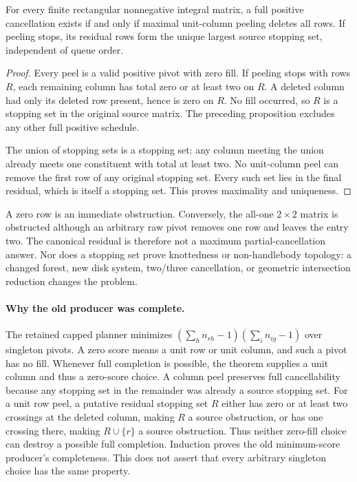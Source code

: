 \begin{proposition}
\label{marked-cut:rectangular-complete}
For every finite rectangular nonnegative integral matrix, a full positive
cancellation exists if and only if maximal unit-column peeling deletes all
rows. If peeling stops, its residual rows form the unique largest source
stopping set, independent of queue order.
\end{proposition}
\begin{proof}
Every peel is a valid positive pivot with zero fill. If peeling stops with
rows $R$, each remaining column has total zero or at least two on $R$.
A deleted column had only its deleted row present, hence is zero on $R$.
No fill occurred, so $R$ is a stopping set in the original source matrix.
The preceding proposition excludes any other full positive schedule.

The union of stopping sets is a stopping set: any column meeting the union
already meets one constituent with total at least two. No unit-column peel
can remove the first row of any original stopping set. Every such set lies
in the final residual, which is itself a stopping set. This proves maximality
and uniqueness.
\end{proof}

A zero row is an immediate obstruction. Conversely, the all-one $2\times2$
matrix is obstructed although an arbitrary raw pivot removes one row and
leaves the entry two. The canonical residual is therefore not a maximum
partial-cancellation answer. Nor does a stopping set prove knottedness or
non-handlebody topology: a changed forest, new disk system, two/three
cancellation, or geometric intersection reduction changes the problem.

\paragraph{Why the old producer was complete.}
The retained capped planner minimizes
$(\sum_hn_{rh}-1)(\sum_in_{ig}-1)$ over singleton pivots. A zero score means
a unit row or unit column, and such a pivot has no fill. Whenever full
completion is possible, the theorem supplies a unit column and thus a
zero-score choice. A column peel preserves full cancellability because any
stopping set in the remainder was already a source stopping set. For a unit
row peel, a putative residual stopping set $R$ either has zero or at least
two crossings at the deleted column, making $R$ a source obstruction, or
has one crossing there, making $R\cup\{r\}$ a source obstruction. Thus
neither zero-fill choice can destroy a possible full completion. Induction
proves the old minimum-score producer's completeness. This does not assert
that every arbitrary singleton choice has the same property.

